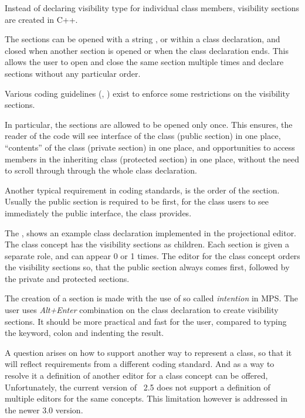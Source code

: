 Instead of declaring visibility type for individual class members, visibility sections are created
in C++. 

The sections can be opened with a string ,  or 
within a class declaration, and closed when another section is opened or when the class declaration
ends. This allows the user to open and close the same section multiple times and declare sections
without any particular order.

Various coding guidelines (\cite{cppclasslayout}, \cite{googlecppstyle}) exist to enforce some 
restrictions on the visibility sections.

In particular, the sections are allowed to be opened only once. This ensures, the
reader of the code will see interface of the class (public section) in one place,
``contents'' of the class (private section) in one place, and opportunities to access members in
the inheriting class (protected section) in one place, without the need to scroll through through
the whole class declaration.

Another typical requirement in coding standards, is the order of the section. Usually the public 
section is required to be first, for the class users to see immediately the public interface,
the class provides.



The , shows an example class declaration implemented in the projectional editor.
The class concept has the visibility sections as children. Each section is given a separate role,
and can appear 0 or 1 times. The editor for the class concept orders the visibility sections so,
that the public section always comes first, followed by the private and protected sections.

The creation of a section is made with the use of so called \emph{intention} in MPS. The user
uses \emph{Alt+Enter} combination on the class declaration to create visibility sections.
It should be more practical and fast for the user, compared to typing the keyword, colon and
indenting the result.

A question arises on how to support another way to represent a class, so that it will reflect
requirements from a different coding standard. And as a way to resolve it a definition of 
another editor for a class concept can be offered, Unfortunately, the current version of \jbmps\ 2.5
does not support a definition of multiple editors for the same concepts. This limitation however
is addressed in the newer 3.0 version.


